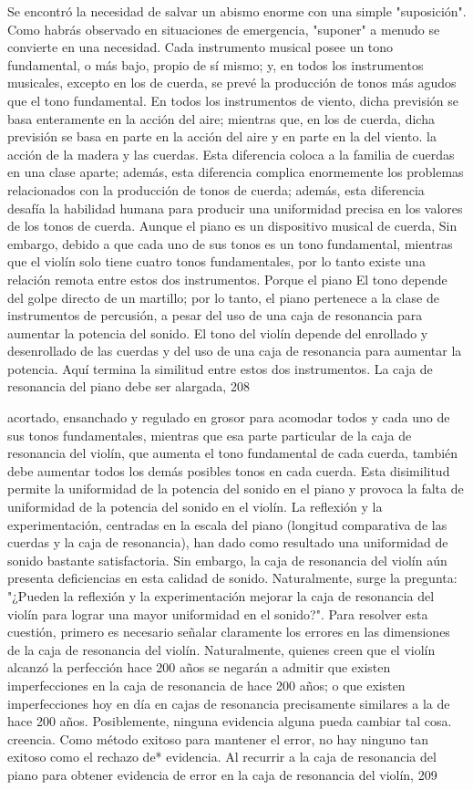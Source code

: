 Se encontró la necesidad de salvar un abismo enorme con una simple "suposición". Como habrás observado en situaciones de emergencia, "suponer" a menudo se convierte en una
necesidad.
Cada instrumento musical posee un tono fundamental, o más bajo, propio de sí mismo; y, en todos los instrumentos musicales, excepto en los de cuerda, se prevé la producción de tonos más agudos que el tono fundamental. En todos los instrumentos de viento, dicha previsión se basa enteramente en la acción del aire; mientras que, en los de cuerda, dicha previsión se basa en parte en la acción del aire y en parte en la del viento.
la acción de la madera y las cuerdas. Esta diferencia
coloca a la familia de cuerdas en una clase aparte; además, esta diferencia complica enormemente los problemas relacionados con la producción de tonos de cuerda; además, esta diferencia desafía la habilidad humana para producir una uniformidad precisa en los valores de los tonos de cuerda. Aunque el piano es un dispositivo musical de cuerda,
Sin embargo, debido a que cada uno de sus tonos es un tono fundamental, mientras que el violín solo tiene cuatro tonos fundamentales, por lo tanto existe una relación remota entre estos dos instrumentos. Porque el piano
El tono depende del golpe directo de un martillo; por lo tanto, el piano pertenece a la clase de instrumentos de percusión, a pesar del uso de una caja de resonancia para aumentar la potencia del sonido. El tono del violín depende del enrollado y desenrollado de las cuerdas y del uso de una caja de resonancia para aumentar la potencia. Aquí termina la similitud entre estos dos instrumentos. La caja de resonancia del piano debe ser alargada,
208

acortado, ensanchado y regulado en grosor para acomodar todos y cada uno de sus tonos fundamentales, mientras que esa parte particular de la caja de resonancia del violín, que aumenta el tono fundamental de cada cuerda, también debe aumentar todos los demás posibles
tonos en cada cuerda. Esta disimilitud permite la uniformidad de la potencia del sonido en el piano y provoca la falta de uniformidad de la potencia del sonido en el
violín.
La reflexión y la experimentación, centradas en la escala del piano (longitud comparativa de las cuerdas y la caja de resonancia), han dado como resultado una uniformidad de sonido bastante satisfactoria. Sin embargo, la caja de resonancia del violín aún presenta deficiencias en esta calidad de sonido. Naturalmente, surge la pregunta: "¿Pueden la reflexión y la experimentación mejorar la caja de resonancia del violín para lograr una mayor uniformidad en el sonido?".
Para resolver esta cuestión, primero es necesario señalar claramente los errores en las dimensiones de la caja de resonancia del violín. Naturalmente, quienes creen que el violín alcanzó la perfección hace 200 años se negarán a admitir que existen imperfecciones en la caja de resonancia de hace 200 años; o que existen imperfecciones hoy en día en cajas de resonancia precisamente similares a la de hace 200 años.
Posiblemente, ninguna evidencia alguna pueda cambiar tal cosa.
creencia.
Como método exitoso para mantener el error, no hay ninguno tan exitoso como el rechazo de* evidencia. Al recurrir a la caja de resonancia del piano para obtener evidencia de error en la caja de resonancia del violín,
209

